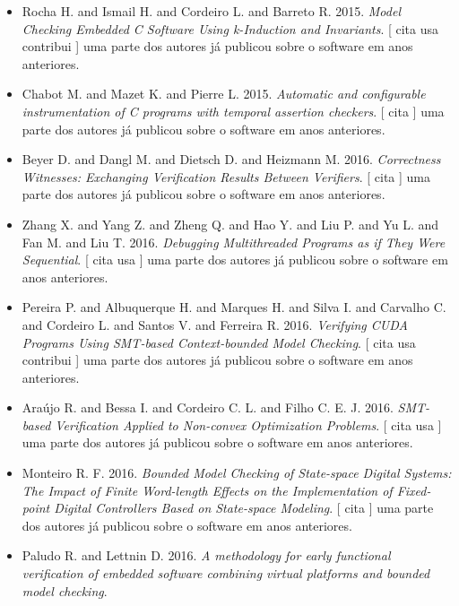 \begin{itemize}
\item Rocha H. and Ismail H. and Cordeiro L. and Barreto R.
      2015.
        \textit{ Model Checking Embedded C Software Using k-Induction and Invariants}.
      [
          cita
          usa
          contribui
      ]
uma parte dos autores já publicou sobre o software em anos anteriores.
\item Chabot M. and Mazet K. and Pierre L.
      2015.
        \textit{ Automatic and configurable instrumentation of C programs with temporal assertion checkers}.
      [
          cita
      ]
uma parte dos autores já publicou sobre o software em anos anteriores.
\item Beyer D. and Dangl M. and Dietsch D. and Heizmann M.
      2016.
        \textit{ Correctness Witnesses: Exchanging Verification Results Between Verifiers}.
      [
          cita
      ]
uma parte dos autores já publicou sobre o software em anos anteriores.
\item Zhang X. and Yang Z. and Zheng Q. and Hao Y. and Liu P. and Yu L. and Fan M. and Liu T.
      2016.
        \textit{ Debugging Multithreaded Programs as if They Were Sequential}.
      [
          cita
          usa
      ]
uma parte dos autores já publicou sobre o software em anos anteriores.
\item Pereira P. and Albuquerque H. and Marques H. and Silva I. and Carvalho C. and Cordeiro L. and Santos V. and Ferreira R.
      2016.
        \textit{ Verifying CUDA Programs Using SMT-based Context-bounded Model Checking}.
      [
          cita
          usa
          contribui
      ]
uma parte dos autores já publicou sobre o software em anos anteriores.
\item Araújo R. and Bessa I. and Cordeiro C. L. and Filho C. E. J.
      2016.
        \textit{ SMT-based Verification Applied to Non-convex Optimization Problems}.
      [
          cita
          usa
      ]
uma parte dos autores já publicou sobre o software em anos anteriores.
\item Monteiro R. F.
      2016.
        \textit{ Bounded Model Checking of State-space Digital Systems: The Impact of Finite Word-length Effects on the Implementation of Fixed-point Digital Controllers Based on State-space Modeling}.
      [
          cita
      ]
uma parte dos autores já publicou sobre o software em anos anteriores.
\item Paludo R. and Lettnin D.
      2016.
        \textit{ A methodology for early functional verification of embedded software combining virtual platforms and bounded model checking}.

\end{itemize}
